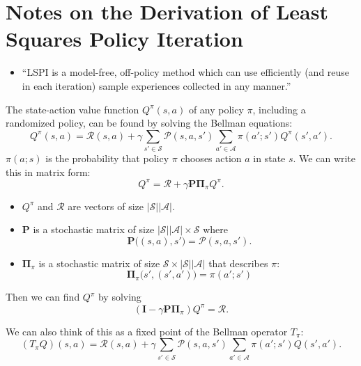 \documentclass{article}
\newcommand{\abs}[1]{\left|#1\right|}
\begin{document}
\section*{Notes on the Derivation of Least Squares Policy Iteration} %
\label{sec:notes_on_the_derivation_of_least_squares_policy_iteration}

	
\begin{itemize}
	\item ``LSPI is a model-free, off-policy method which can use efficiently (and reuse in each iteration) sample experiences collected in any manner.''
\end{itemize}

The state-action value function $Q^{\pi}(s,a)$ of any policy $\pi$, including a randomized policy, can be found by solving the Bellman equations:
\[
	Q^{\pi}(s,a)=\mathcal{R}(s,a)+\gamma\sum_{s'\in \mathcal{S}}\mathcal{P}(s,a,s')
		\sum_{a'\in \mathcal{A}}\pi(a';s')Q^{\pi}(s',a').
\]
$\pi(a;s)$ is the probability that policy $\pi$ chooses action $a$ in state $s$. We can write this in matrix form:
\[
	Q^{\pi}=\mathcal{R}+\gamma\mathbf{P}\mathbf{\Pi}_{\pi}Q^{\pi}.
\]
\begin{itemize}
	\item $Q^{\pi}$ and $\mathcal{R}$ are vectors of size $\abs{\mathcal{S}}\abs{\mathcal{A}}$.
	\item $\mathbf{P}$ is a stochastic matrix of size $\abs{\mathcal{S}}\abs{\mathcal{A}}\times \mathcal{S}$ where
		\[
			\mathbf{P}\bigl((s,a),s'\bigr)=\mathcal{P}(s,a,s').
		\]
	\item $\mathbf{\Pi}_{\pi}$ is a stochastic matrix of size $\mathcal{S}\times \abs{\mathcal{S}}\abs{\mathcal{A}}$ that describes $\pi$:
		\[
			\mathbf{\Pi}_{\pi}\bigl(s',(s',a')\bigr)=\pi(a';s')
		\]
\end{itemize}

Then we can find $Q^{\pi}$ by solving
\[
	(\mathbf{I}-\gamma \mathbf{P}\mathbf{\Pi}_{\pi})Q^{\pi}=\mathcal{R}.
\]

We can also think of this as a fixed point of the Bellman operator $T_{\pi}$:
\[
	(T_{\pi}Q)(s,a)=\mathcal{R}(s,a)+
	\gamma\sum_{s'\in \mathcal{S}}
	\mathcal{P}(s,a,s')\sum_{a'\in \mathcal{A}}
	\pi(a';s')Q(s',a').
\]
\end{document}
